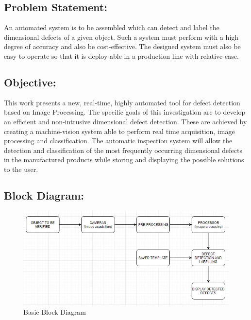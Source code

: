 \documentclass[12pt]{article}
\begin{document}
\subsection{Problem Statement:}
{\quad}An automated system is to be assembled which can detect and label the dimensional defects of a given object. Such a system must  perform with a high degree of accuracy and also be cost-effective. The designed system must also be easy to operate so that it is deploy-able in a production line with relative ease.

\subsection{Objective:}
{\quad}This work presents a new, real-time, highly automated tool for defect detection based on Image Processing. The specific goals of this investigation are to develop an efficient and non-intrusive dimensional defect detection. These are achieved by creating a machine-vision system able to perform real time acquisition,  image processing and classification. The automatic inspection system will allow the detection and classification of the most frequently occurring dimensional defects in the manufactured products while storing and displaying the possible solutions to the user.


\subsection{Block Diagram:}
\begin{figure}[h]
\centering
\includegraphics[scale=.8]{bd.jpg}
\caption{Basic Block Diagram}
\end{figure}
\end{document}
